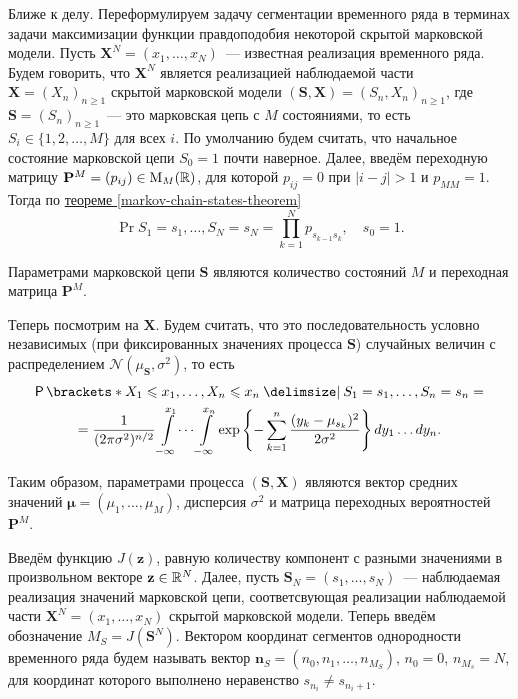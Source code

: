 Ближе к делу. Переформулируем задачу сегментации временного ряда в терминах 
задачи максимизации функции правдоподобия некоторой скрытой марковской модели. 
Пусть \(\mathbf{X}^{N} = (x_{1}, \ldots, x_{N})\)~--- известная реализация 
временного ряда. Будем говорить, что \(\mathbf{X}^{N}\) является реализацией 
наблюдаемой части \(\mathbf{X} = (X_{n})_{n \geq 1}\) скрытой марковской 
модели \((\mathbf{S}, \mathbf{X}) = (S_{n}, X_{n})_{n \geq 1}\), где 
\(\mathbf{S} = (S_{n})_{n \geq 1}\)~--- это марковская цепь с \(M\) 
состояниями, то есть \(S_{i} \in \{1, 2, \ldots, M\}\) для всех \(i\). По 
умолчанию будем считать, что начальное состояние марковской цепи \(S_{0} = 1\) 
почти наверное. Далее, введём переходную матрицу \(\mathbf{P}^{M} = 
(p_{ij}) \in \mathrm{M}_{M}(\mathbb{R})\), для которой \(p_{ij} = 0\) при \(|i - j| > 
1\) и \(p_{MM} = 1\). Тогда по \hyperref[markov-chain-states-theorem]{теореме 
\ref*{markov-chain-states-theorem}}
\[
	\Pr{S_{1} = s_{1}, \ldots, S_{N} = s_{N}} = \prod_{k = 1}^{N} p_{s_{k - 
	1}s_{k}}, \quad s_{0} = 1.
\]

Параметрами марковской цепи \(\mathbf{S}\) являются количество состояний \(M\) 
и переходная матрица \(\mathbf{P}^{M}\).

Теперь посмотрим на \(\mathbf{X}\). Будем считать, что это последовательность 
условно независимых (при фиксированных значениях процесса \(\mathbf{S}\)) 
случайных величин с распределением \(\mathcal{N}(\mu_{\mathbf{S}}, 
\sigma^{2})\), то есть
\begin{multline*}
	\Pr{X_{1} \leq x_{1}, \ldots, X_{n} \leq x_{n} \given S_{1} = s_{1}, 
	\ldots, S_{n} = s_{n}} = \\ = \frac{1}{(2\pi\sigma^{2})^{n/2}} 
	\int\limits_{-\infty}^{x_{1}}\dots\int\limits_{-\infty}^{x_{n}}  
	\exp\left\{-\sum_{k = 1}^{n}\frac{(y_{k} - \mu_{s_{k}})^{2}}{2\sigma^{2}} 
	\right\}\diff y_{1} \ldots \diff y_{n}.
\end{multline*}

Таким образом, параметрами процесса \((\mathbf{S}, \mathbf{X})\) являются 
вектор средних значений \(\bm{\mu} = (\mu_{1}, \ldots, \mu_{M})\), дисперсия 
\(\sigma^{2}\) и матрица переходных вероятностей \(\mathbf{P}^{M}\).

Введём функцию \(J(\mathbf{z})\), равную количеству компонент с разными 
значениями в произвольном векторе \(\mathbf{z} \in \mathbb{R}^{N}\). Далее, пусть 
\(\mathbf{S}_{N} = (s_{1}, \ldots, s_{N})\)~--- наблюдаемая реализация значений 
марковской цепи, соответсвующая реализации наблюдаемой части \(\mathbf{X}^{N} = 
(x_{1}, \ldots, x_{N})\) скрытой марковской модели. Теперь введём обозначение 
\(M_{S} = J(\mathbf{S}^{N})\). Вектором координат сегментов однородности 
временного ряда будем называть вектор \(\mathbf{n}_{S} = (n_{0}, n_{1}, 
\ldots, n_{M_{S}})\), \(n_{0} = 0\), \(n_{M_{s}} = N\), для координат которого 
выполнено неравенство \(s_{n_{i}} \neq s_{n_{i} + 1}\).

